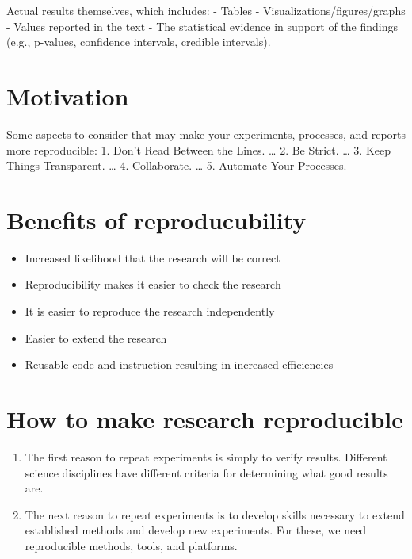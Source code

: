 \documentclass[
]{book}
\providecommand{\tightlist}{%
  \setlength{\itemsep}{0pt}\setlength{\parskip}{0pt}}
\begin{document}
Actual results themselves, which includes:
- Tables
- Visualizations/figures/graphs
- Values reported in the text
- The statistical evidence in support of the findings (e.g., p-values, confidence intervals, credible intervals).

\hypertarget{motivation}{%
\section{Motivation}\label{motivation}}

Some aspects to consider that may make your experiments, processes, and reports more reproducible:
1. Don't Read Between the Lines. \ldots{}
2. Be Strict. \ldots{}
3. Keep Things Transparent. \ldots{}
4. Collaborate. \ldots{}
5. Automate Your Processes.

\hypertarget{benefits-of-reproducubility}{%
\section{Benefits of reproducubility}\label{benefits-of-reproducubility}}

\begin{itemize}
\tightlist
\item
  Increased likelihood that the research will be correct
\item
  Reproducibility makes it easier to check the research
\item
  It is easier to reproduce the research independently
\item
  Easier to extend the research
\item
  Reusable code and instruction resulting in increased efficiencies
\end{itemize}

\hypertarget{how-to-make-research-reproducible}{%
\section{How to make research reproducible}\label{how-to-make-research-reproducible}}

\begin{enumerate}
\def\labelenumi{\arabic{enumi})}
\tightlist
\item
  The first reason to repeat experiments is simply to verify results. Different science disciplines have different criteria for determining what good results are.
\item
  The next reason to repeat experiments is to develop skills necessary to extend established methods and develop new experiments. For these, we need reproducible methods, tools, and platforms.
\end{enumerate}
\end{document}

